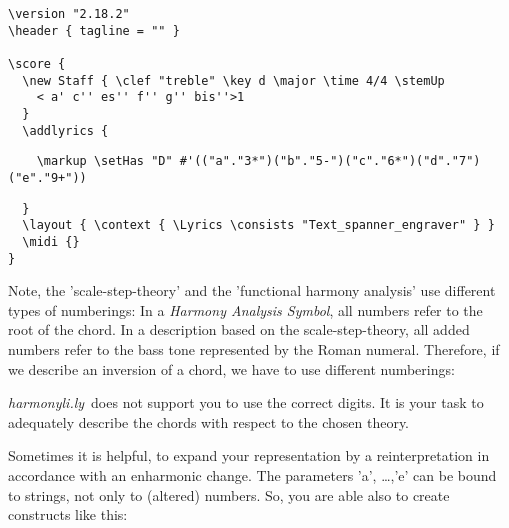 \documentclass[
  DIV=calc,
  BCOR=5mm,
  12pt,
  headings=small,
  oneside,
  abstract=true,
  toc=bib,
  xcolor=dvipsnames,
  openany,
  english]{scrartcl}
\newcommand{\hlyn}[0]{\textit{harmonyli.ly}}
\newcommand{\has}[1]{\textit{Harmony Analysis Symbol#1}}
\begin{document}
\begin{scriptsize}
\begin{verbatim}
\version "2.18.2"
\header { tagline = "" }

\score {
  \new Staff { \clef "treble" \key d \major \time 4/4 \stemUp
    < a' c'' es'' f'' g'' bis''>1
  }
  \addlyrics {
  \end{verbatim}
  { \color{red} \verb|    \markup \setHas "D" #'(("a"."3*")("b"."5-")("c"."6*")("d"."7")("e"."9+")) |
  }
\begin{verbatim}
  }
  \layout { \context { \Lyrics \consists "Text_spanner_engraver" } }
  \midi {}
}
\end{verbatim}
\end{scriptsize}

Note, the 'scale-step-theory' and the 'functional harmony analysis' use
different types of numberings: In a \has{}, all numbers refer to the root of the
chord. In a description based on the scale-step-theory, all added numbers refer
to the bass tone represented by the Roman numeral. Therefore, if we describe an
inversion of a chord, we have to use different numberings:

\begin{center}
\end{center}

\hlyn\ does not support you to use the correct digits. It is your task
to adequately describe the chords with respect to the chosen theory.

Sometimes it is helpful, to expand your representation by a reinterpretation in
accordance with an enharmonic change. The parameters 'a', \ldots,'e' can be bound
to strings, not only to (altered) numbers. So, you are able also to create
constructs like this:

\begin{center}
\end{center}
\end{document}
